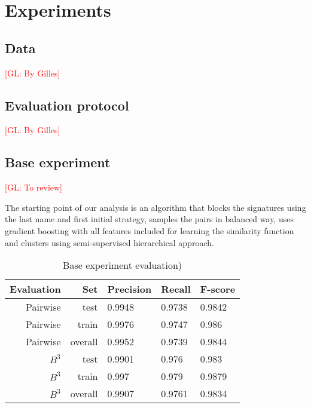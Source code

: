 \documentclass{article}
\newcommand{\glnote}[1]{\textcolor{red}{[GL: #1]}}
\begin{document}

\section{Experiments}
\label{experiments}

\subsection{Data}

\glnote{By Gilles}


\subsection{Evaluation protocol}

\glnote{By Gilles}


\subsection{Base experiment}

\glnote{To review}

The starting point of our analysis is an algorithm that blocks the signatures using the last
name and first initial strategy, samples the pairs in balanced way, uses gradient boosting
with all features included for learning the similarity function and clusters using
semi-supervised hierarchical approach.

\begin{table}[H]
\caption{Base experiment evaluation)}
\centering
\begin{tabular}{|r|r|l|l|l|}
  \hline
  Evaluation & Set & Precision & Recall & F-score \\
  \hline
  Pairwise & test & 0.9948 & 0.9738 & 0.9842 \\
  \hline
  Pairwise & train & 0.9976 & 0.9747 & 0.986 \\
  \hline
  Pairwise & overall & 0.9952 & 0.9739 & 0.9844 \\
  \hline
  $B^3$ & test & 0.9901 & 0.976 & 0.983 \\
  \hline
  $B^3$ & train & 0.997 & 0.979 & 0.9879 \\
  \hline
  $B^3$ & overall & 0.9907 & 0.9761 & 0.9834 \\
  \hline
\end{tabular}
\end{table}
\end{document}
